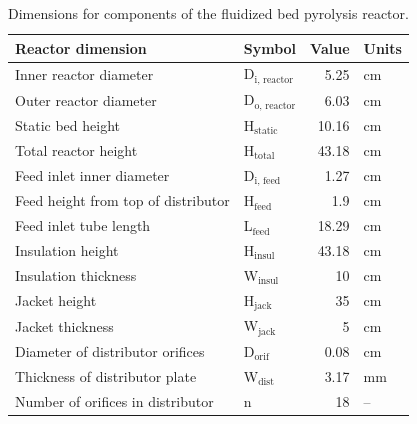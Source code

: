 \documentclass[12pt,titlepage]{article}
\begin{document}
\begin{table}[H]
    \centering
    \caption{Dimensions for components of the fluidized bed pyrolysis reactor.}
    \label{tab:dimensions}
    \begin{tabular}{llrl}
        \toprule
        Reactor dimension & Symbol & Value & Units \\
        \midrule
        Inner reactor diameter              & D$_{\textrm{i, reactor}}$  & 5.25  & cm \\
        Outer reactor diameter              & D$_{\textrm{o, reactor}}$  & 6.03  & cm \\
        Static bed height                   & H$_{\textrm{static}}$      & 10.16 & cm \\
        Total reactor height                & H$_{\textrm{total}}$       & 43.18 & cm \\
        Feed inlet inner diameter           & D$_{\textrm{i, feed}}$     & 1.27  & cm \\
        Feed height from top of distributor & H$_{\textrm{feed}}$        & 1.9   & cm \\
        Feed inlet tube length              & L$_{\textrm{feed}}$        & 18.29 & cm \\
        Insulation height                   & H$_{\textrm{insul}}$       & 43.18 & cm \\
        Insulation thickness                & W$_{\textrm{insul}}$       & 10    & cm \\
        Jacket height                       & H$_{\textrm{jack}}$        & 35    & cm \\
        Jacket thickness                    & W$_{\textrm{jack}}$        & 5     & cm \\
        Diameter of distributor orifices    & D$_{\textrm{orif}}$        & 0.08  & cm \\
        Thickness of distributor plate      & W$_{\textrm{dist}}$        & 3.17  & mm \\
        Number of orifices in distributor   & n                          & 18    & -- \\
        \bottomrule
    \end{tabular}
\end{table}
\end{document}
